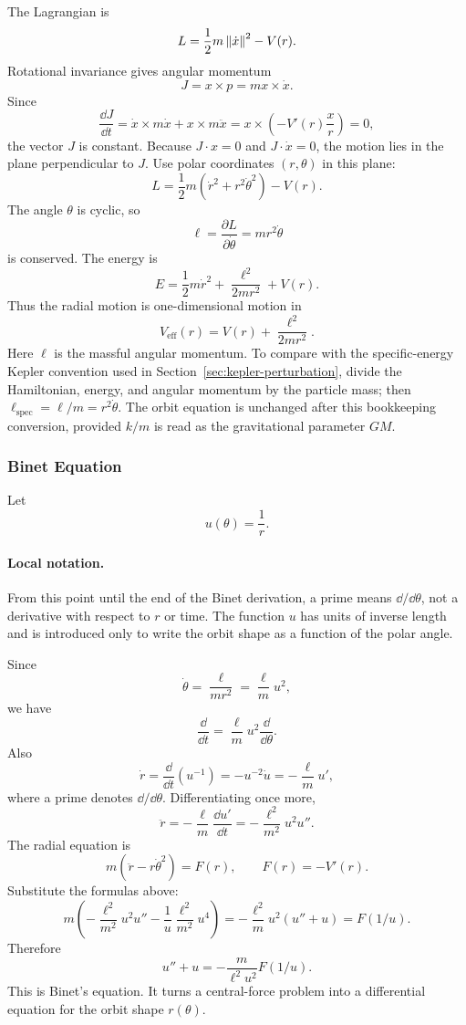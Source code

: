 The Lagrangian is
\[
  L=\frac12m\left\lVert \dot x\right\rVert^2-V(r).
\]
Rotational invariance gives angular momentum
\[
  J=x\times p=m x\times\dot x.
\]
Since
\[
  \frac{\dd J}{\dd t}
  =
  \dot x\times m\dot x+x\times m\ddot x
  =
  x\times\left(-V'(r)\frac{x}{r}\right)=0,
\]
the vector \(J\) is constant. Because \(J\cdot x=0\) and
\(J\cdot\dot x=0\), the motion lies in the plane perpendicular to \(J\). Use
polar coordinates \((r,\theta)\) in this plane:
\[
  L=\frac12m(\dot r^2+r^2\dot\theta^2)-V(r).
\]
The angle \(\theta\) is cyclic, so
\[
  \ell=\frac{\partial L}{\partial\dot\theta}=mr^2\dot\theta
\]
is conserved. The energy is
\[
  E=\frac12m\dot r^2+\frac{\ell^2}{2mr^2}+V(r).
\]
Thus the radial motion is one-dimensional motion in
\[
  V_{\mathrm{eff}}(r)
  =
  V(r)+\frac{\ell^2}{2mr^2}.
\]
Here \(\ell\) is the massful angular momentum. To compare with the
specific-energy Kepler convention used in
Section~\ref{sec:kepler-perturbation}, divide the Hamiltonian, energy, and
angular momentum by the particle mass; then
\(\ell_{\mathrm{spec}}=\ell/m=r^2\dot\theta\). The orbit equation is unchanged
after this bookkeeping conversion, provided \(k/m\) is read as the
gravitational parameter \(GM\).

\subsubsection{Binet Equation}
\label{subsec:detailed-binet}

Let
\[
  u(\theta)=\frac1r.
\]

\paragraph{Local notation.}
From this point until the end of the Binet derivation, a prime means
\(\dd/\dd\theta\), not a derivative with respect to \(r\) or time.  The function
\(u\) has units of inverse length and is introduced only to write the orbit
shape as a function of the polar angle.

Since
\[
  \dot\theta=\frac{\ell}{mr^2}=\frac{\ell}{m}u^2,
\]
we have
\[
  \frac{\dd}{\dd t}
  =
  \frac{\ell}{m}u^2\frac{\dd}{\dd\theta}.
\]
Also
\[
  \dot r
  =
  \frac{\dd}{\dd t}(u^{-1})
  =
  -u^{-2}\dot u
  =
  -\frac{\ell}{m}u',
\]
where a prime denotes \(\dd/\dd\theta\). Differentiating once more,
\[
  \ddot r
  =
  -\frac{\ell}{m}\frac{\dd u'}{\dd t}
  =
  -\frac{\ell^2}{m^2}u^2u''.
\]
The radial equation is
\[
  m(\ddot r-r\dot\theta^2)=F(r),
  \qquad
  F(r)=-V'(r).
\]
Substitute the formulas above:
\[
  m\left(
    -\frac{\ell^2}{m^2}u^2u''
    -
    \frac1u\frac{\ell^2}{m^2}u^4
  \right)
  =
  -\frac{\ell^2}{m}u^2(u''+u)
  =
  F(1/u).
\]
Therefore
\[
  \boxed{
  u''+u
  =
  -\frac{m}{\ell^2u^2}F(1/u).
  }
\]
This is Binet's equation. It turns a central-force problem into a differential
equation for the orbit shape \(r(\theta)\).

